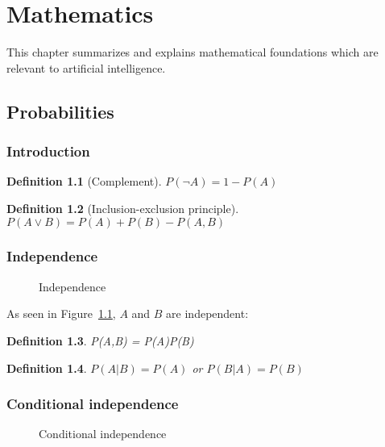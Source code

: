\documentclass{report}
\newtheorem{definition}{Definition}[section]
\begin{document}
\chapter{Mathematics}
This chapter summarizes and explains mathematical foundations which are relevant to artificial intelligence.

\section{Probabilities}
\subsection{Introduction}

\begin{definition}[Complement]
$P(\neg A) = 1 - P(A)$
\end{definition}

\begin{definition}[Inclusion-exclusion principle]
$P(A\vee B) =P(A) + P(B) - P(A,B)$
\end{definition}


\subsection{Independence}

\begin{figure}[h!]
\centering
{}
\caption{Independence}
\label{ref:independence}
\end{figure}

As seen in Figure~\ref{ref:independence}, $A$ and $B$ are independent:
\begin{definition}
P(A,B) = P(A)P(B)
\end{definition}

\begin{definition}
$P(A\vert B) = P(A)$ or $P(B\vert A) = P(B)$ 
\end{definition}


\subsection{Conditional independence}

\begin{figure}[h!]
\centering
{}
\caption{Conditional independence}
\label{ref:condindependence1}
\end{figure}
\end{document}
